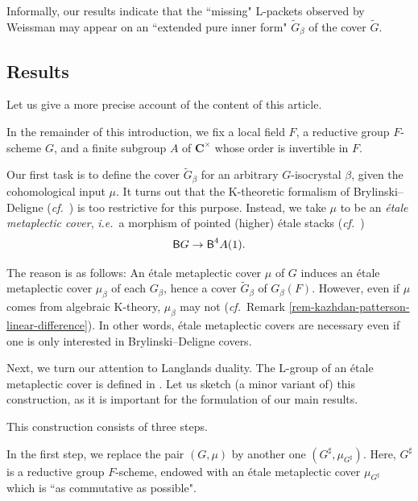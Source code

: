 \documentclass[10pt,english,reqno]{amsart}
\newcommand{\complexes}{\mathbf C}
\newcommand{\deloop}{\textnormal{\textsf{B}}}
\theoremstyle{definition}
\numberwithin{equation}{section}
\begin{document}
Informally, our results indicate that the ``missing" L-packets observed by Weissman may appear on an ``extended pure inner form" $\widetilde G_{\beta}$ of the cover $\widetilde G$.



\subsection{Results}

Let us give a more precise account of the content of this article.

In the remainder of this introduction, we fix a local field $F$, a reductive group $F$-scheme $G$, and a finite subgroup $A$ of $\complexes^{\times}$ whose order is invertible in $F$.

Our first task is to define the cover $\widetilde G_{\beta}$ for an arbitrary $G$-isocrystal $\beta$, given the cohomological input $\mu$. It turns out that the K-theoretic formalism of Brylinski--Deligne (\emph{cf.}~\cite{MR1896177}) is too restrictive for this purpose. Instead, we take $\mu$ to be an \emph{\'etale metaplectic cover}, \emph{i.e.}~a morphism of pointed (higher) \'etale stacks (\emph{cf.}~\cite{MR1441006, MR3769731, zhao2022metaplectic})
$$
\deloop G \rightarrow \deloop^4A(1).
$$

The reason is as follows: An \'etale metaplectic cover $\mu$ of $G$ induces an \'etale metaplectic cover $\mu_{\beta}$ of each $G_{\beta}$, hence a cover $\widetilde G_{\beta}$ of $G_{\beta}(F)$. However, even if $\mu$ comes from algebraic K-theory, $\mu_{\beta}$ may not (\emph{cf.}~Remark \ref{rem-kazhdan-patterson-linear-difference}). In other words, \'etale metaplectic covers are necessary even if one is only interested in Brylinski--Deligne covers.

Next, we turn our attention to Langlands duality. The L-group of an \'etale metaplectic cover is defined in \cite{zhao2022metaplectic}. Let us sketch (a minor variant of) this construction, as it is important for the formulation of our main results.

This construction consists of three steps.

In the first step, we replace the pair $(G, \mu)$ by another one $(G^{\sharp}, \mu_{G^{\sharp}})$. Here, $G^{\sharp}$ is a  reductive group $F$-scheme, endowed with an \'etale metaplectic cover $\mu_{G^{\sharp}}$ which is ``as commutative as possible".
\end{document}
